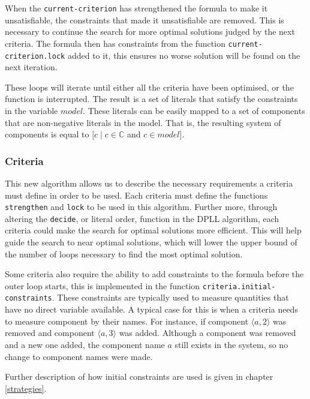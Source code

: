 When the \verb+current-criterion+ has strengthened the formula to make it unsatisfiable, the constraints that made it unsatisfiable are removed.
This is necessary to continue the search for more optimal solutions judged by the next criteria.
The formula then has constraints from the function \verb+current-criterion.lock+ added to it, this ensures no worse solution will be found on the next iteration.

These loops will iterate until either all the criteria have been optimised, or the function is interrupted.
The result is a set of literals that satisfy the constraints in the variable $model$.
These literals can be easily mapped to a set of components that are non-negative literals in the model.
That is, the resulting system of components is equal to $[c \mid c \in \mathbb{C}$ and $c \in model]$.

\subsubsection{Criteria}
This new algorithm allows us to describe the necessary requirements a criteria must define in order to be used.
Each criteria must define the functions \texttt{strengthen} and \verb+lock+ to be used in this algorithm.
Further more, through altering the \verb+decide+, or literal order, function in the DPLL algorithm, each criteria could make the search for optimal solutions more efficient.
This will help guide the search to near optimal solutions, which will lower the upper bound of the number of loops necessary to find the most optimal solution.

Some criteria also require the ability to add constraints to the formula before the outer loop starts,
this is implemented in the function \verb+criteria.initial-constraints+.
These constraints are typically used to measure quantities that have no direct variable available.
A typical case for this is when a criteria needs to measure component by their names.
For instance, if component $\langle a,2\rangle$ was removed and component $\langle a,3 \rangle$ was added. 
Although a component was removed and a new one added, the component name $a$ still exists in the system, so no change to component names were made.

Further description of how initial constraints are used is given in chapter \ref{strategies}. 



